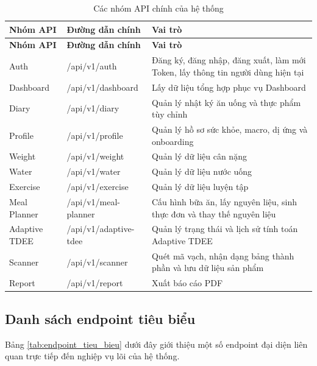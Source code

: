 \documentclass[12pt, a4paper]{report}
\begin{document}
\begin{longtable}{|>{\raggedright\arraybackslash}p{4cm}|>{\raggedright\arraybackslash}p{4cm}|p{7cm}|}
\caption{Các nhóm API chính của hệ thống}
\label{tab:nhom_api_chinh} \\
\hline
\textbf{Nhóm API} & \textbf{Đường dẫn chính} & \textbf{Vai trò} \\
\hline
\endfirsthead
\hline
\textbf{Nhóm API} & \textbf{Đường dẫn chính} & \textbf{Vai trò} \\
\hline
\endhead

Auth & /api/v1/auth & Đăng ký, đăng nhập, đăng xuất, làm mới Token, lấy thông tin người dùng hiện tại \\
\hline
Dashboard & /api/v1/dashboard & Lấy dữ liệu tổng hợp phục vụ Dashboard \\
\hline
Diary & /api/v1/diary & Quản lý nhật ký ăn uống và thực phẩm tùy chỉnh \\
\hline
Profile & /api/v1/profile & Quản lý hồ sơ sức khỏe, macro, dị ứng và onboarding \\
\hline
Weight & /api/v1/weight & Quản lý dữ liệu cân nặng \\
\hline
Water & /api/v1/water & Quản lý dữ liệu nước uống \\
\hline
Exercise & /api/v1/exercise & Quản lý dữ liệu luyện tập \\
\hline
Meal Planner & /api/v1/meal-planner & Cấu hình bữa ăn, lấy nguyên liệu, sinh thực đơn và thay thế nguyên liệu \\
\hline
Adaptive TDEE & /api/v1/adaptive-tdee & Quản lý trạng thái và lịch sử tính toán Adaptive TDEE \\
\hline
Scanner & /api/v1/scanner & Quét mã vạch, nhận dạng bảng thành phần và lưu dữ liệu sản phẩm \\
\hline
Report & /api/v1/report & Xuất báo cáo PDF \\
\hline
\end{longtable}

\subsection{Danh sách endpoint tiêu biểu}
Bảng \ref{tab:endpoint_tieu_bieu} dưới đây giới thiệu một số endpoint đại diện liên quan trực tiếp đến nghiệp vụ lõi của hệ thống.
\end{document}
